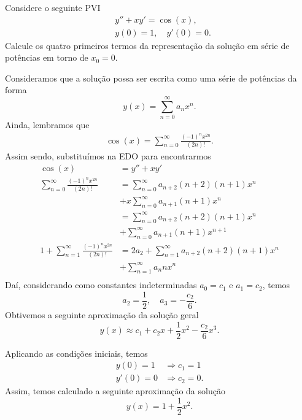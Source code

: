 \begin{exeresol}
  Considere o seguinte PVI
  \begin{align}
    & y'' + xy' = \cos(x),\\
    & y(0)=1,\quad y'(0)=0.
  \end{align}
  Calcule os quatro primeiros termos da representação da solução em série de potências em torno de $x_0=0$.
\end{exeresol}
\begin{resol}
  Consideramos que a solução possa ser escrita como uma série de potências da forma
  \begin{equation}
    y(x) = \sum_{n=0}^\infty a_nx^n.
  \end{equation}
  Ainda, lembramos que
  \begin{align}
    \cos(x) = \sum_{n=0}^\infty \frac{(-1)^nx^{2n}}{(2n)!}.
  \end{align}
  Assim sendo, substituímos na EDO para encontrarmos
  \begin{align}
    \cos(x) &= y'' + xy' \\
    \sum_{n=0}^\infty \frac{(-1)^nx^{2n}}{(2n)!} &= \sum_{n=0}^\infty a_{n+2}(n+2)(n+1)x^n \\
    &+ x\sum_{n=0}^\infty a_{n+1}(n+1)x^n \\
    &= \sum_{n=0}^\infty a_{n+2}(n+2)(n+1)x^n \\
    &+ \sum_{n=0}^\infty a_{n+1}(n+1)x^{n+1} \\
    1 + \sum_{n=1}^\infty \frac{(-1)^nx^{2n}}{(2n)!} &= 2a_2 + \sum_{n=1}^\infty a_{n+2}(n+2)(n+1)x^n \\
    &+ \sum_{n=1}^\infty a_nnx^n \\
  \end{align}
  Daí, considerando como constantes indeterminadas $a_0=c_1$ e $a_1=c_2$, temos
  \begin{equation}
    a_2 = \frac{1}{2},\quad a_3 = -\frac{c_2}{6}. 
  \end{equation}
  Obtivemos a seguinte aproximação da solução geral
  \begin{equation}
    y(x) \approx c_1 + c_2x + \frac{1}{2}x^2 - \frac{c_2}{6}x^3.
  \end{equation}

  Aplicando as condições iniciais, temos
  \begin{align}
    y(0) = 1 &\Rightarrow c_1 = 1\\
    y'(0) = 0 &\Rightarrow c_2 = 0.
  \end{align}
  Assim, temos calculado a seguinte aproximação da solução
  \begin{equation}
    y(x) = 1 + \frac{1}{2}x^2.
  \end{equation}
\end{resol}


